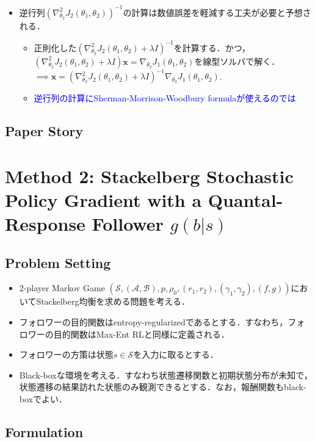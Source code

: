 \documentclass[a4paper,10pt,dvipdfmx]{jsarticle}
\begin{document}
\begin{itemize}
    \item 逆行列$(\nabla_{\theta_2}^2J_2(\theta_1,\theta_2))^{-1}$の計算は数値誤差を軽減する工夫が必要と予想される．
    \begin{itemize}
        \item 正則化した$(\nabla_{\theta_2}^2J_2(\theta_1,\theta_2)+\lambda I)^{-1}$を計算する\cite{Yang2023-tf}．かつ，$(\nabla_{\theta_2}^2J_2(\theta_1,\theta_2)+\lambda I)\mathbf{x}=\nabla_{\theta_2}J_1(\theta_1,\theta_2)$を線型ソルバで解く．$\implies \mathbf{x}=(\nabla_{\theta_2}^2J_2(\theta_1,\theta_2)+\lambda I)^{-1}\nabla_{\theta_2}J_1(\theta_1,\theta_2)$.
        \item \textcolor{blue}{逆行列の計算にSherman-Morrison-Woodbury formulaが使えるのでは}
    \end{itemize}
\end{itemize}


\subsection{Paper Story}

\section{Method 2: Stackelberg Stochastic Policy Gradient with a Quantal-Response Follower $g(b|s)$}\label{sec:ST_SPG_QRF}

\subsection{Problem Setting}

\begin{itemize}
    \item 2-player Markov Game $(\mathcal{S}, (\mathcal{A},\mathcal{B}), p, \rho_0, (r_1,r_2), (\gamma_1,\gamma_2),(f,g))$においてStackelberg均衡を求める問題を考える．
    \item フォロワーの目的関数はentropy-regularizedであるとする．すなわち，フォロワーの目的関数はMax-Ent RLと同様に定義される．
    \item フォロワーの方策は状態$s\in\mathcal{S}$を入力に取るとする．
    \item Black-boxな環境を考える．すなわち状態遷移関数と初期状態分布が未知で，状態遷移の結果訪れた状態のみ観測できるとする．なお，報酬関数もblack-boxでよい．
\end{itemize}

\subsection{Formulation}
\end{document}
